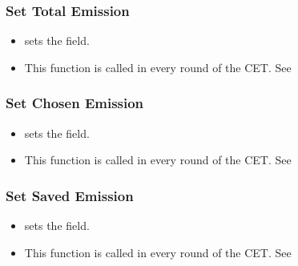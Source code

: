 \documentclass[letterpaper,10pt,english]{sphinxmanual}
\begin{document}
\subsubsection{Set Total Emission}
\label{\detokenize{Player_fields:set-total-emission}}\begin{itemize}
\item {} 
 sets the  field.

\item {} 
This function is called in every round of the CET. See {\hyperref[\detokenize{pages:exp-page}]{}}

\end{itemize}


\subsubsection{Set Chosen Emission}
\label{\detokenize{Player_fields:set-chosen-emission}}\begin{itemize}
\item {} 
 sets the  field.

\item {} 
This function is called in every round of the CET. See {\hyperref[\detokenize{pages:exp-page}]{}}

\end{itemize}


\subsubsection{Set Saved Emission}
\label{\detokenize{Player_fields:set-saved-emission}}\begin{itemize}
\item {} 
 sets the  field.

\item {} 
This function is called in every round of the CET. See {\hyperref[\detokenize{pages:exp-page}]{}}

\end{itemize}
\end{document}
